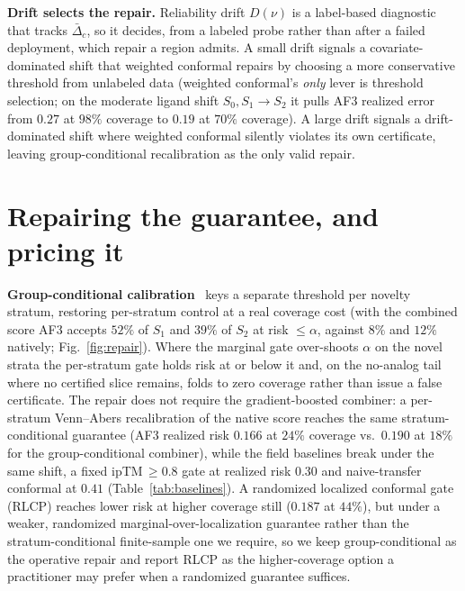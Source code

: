 \documentclass[10pt]{article}
\begin{document}
\textbf{Drift selects the repair.} Reliability drift $D(\nu)$ is a label-based diagnostic that tracks
$\bar\Delta_c$, so it decides, from a labeled probe rather than after a failed deployment, which repair a
region admits. A small drift signals a covariate-dominated shift that weighted conformal repairs by choosing
a more conservative threshold from unlabeled data (weighted conformal's \emph{only} lever is threshold
selection; on the moderate ligand shift $S_0,S_1\!\to\!S_2$ it pulls AF3 realized error from $0.27$ at
$98\%$ coverage to $0.19$ at $70\%$ coverage). A large drift signals a drift-dominated shift where
weighted conformal silently violates its own certificate, leaving group-conditional recalibration as the
only valid repair.

\section{Repairing the guarantee, and pricing it}\label{sec:repair}
\textbf{Group-conditional calibration}~\citep{mondrian} keys a separate threshold per novelty stratum,
restoring per-stratum control at a real coverage cost (with the combined score AF3 accepts $52\%$ of
$S_1$ and $39\%$ of $S_2$ at risk $\le\alpha$, against $8\%$ and $12\%$ natively; Fig.~\ref{fig:repair}).
Where the marginal gate over-shoots $\alpha$ on the novel strata the per-stratum gate holds risk at or
below it and, on the no-analog tail where no certified slice remains, folds to zero coverage rather than
issue a false certificate. The repair does not require the gradient-boosted combiner: a per-stratum
Venn--Abers recalibration of the native score reaches the same stratum-conditional guarantee (AF3 realized
risk $0.166$ at $24\%$ coverage vs.\ $0.190$ at $18\%$ for the group-conditional combiner), while the field
baselines break under the same shift, a fixed ipTM$\,\ge0.8$ gate at realized risk $0.30$ and
naive-transfer conformal at $0.41$ (Table~\ref{tab:baselines}). A randomized localized conformal gate
(RLCP) reaches lower risk at higher coverage still ($0.187$ at $44\%$), but under a weaker, randomized
marginal-over-localization guarantee rather than the stratum-conditional finite-sample one we require, so we
keep group-conditional as the operative repair and report RLCP as the higher-coverage option a practitioner
may prefer when a randomized guarantee suffices.
\end{document}
